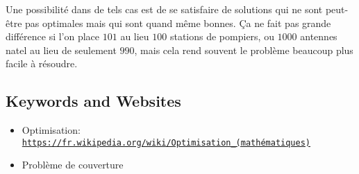 \documentclass[a4paper,11pt]{report}
\newcommand{\BrochureUrlText}[1]{\texttt{#1}}
\begin{document}
Une possibilité dans de tels cas est de se satisfaire de solutions qui ne sont peut-être pas optimales mais qui sont quand même bonnes. Ça ne fait pas grande différence si l’on place $101$ au lieu $100$ stations de pompiers, ou $1000$ antennes natel au lieu de seulement $990$, mais cela rend souvent le problème beaucoup plus facile à résoudre.

{\raggedright

\subsection*{Keywords and Websites}

\begin{itemize}
  \item Optimisation: \href{https://fr.wikipedia.org/wiki/Optimisation_(math\%C3\%A9matiques)}{\BrochureUrlText{https://fr.wikipedia.org/wiki/Optimisation\_(mathématiques)}}
  \item Problème de couverture
\end{itemize}


}
\end{document}
